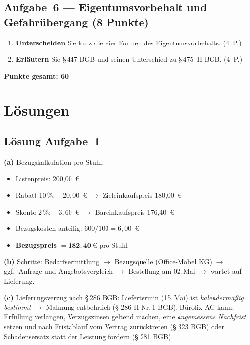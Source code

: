 \documentclass[11pt, a4paper]{article}
\begin{document}
\subsection*{Aufgabe~6 --- Eigentumsvorbehalt und Gefahrübergang (8 Punkte)}

\begin{enumerate}[label=(\alph*)]
  \item \textbf{Unterscheiden} Sie kurz die vier Formen des Eigentumsvorbehalts. \hfill (4~P.)
  \item \textbf{Erläutern} Sie §\,447 BGB und seinen Unterschied zu §\,475~II BGB. \hfill (4~P.)
\end{enumerate}

\vspace{1em}
\noindent\textbf{Punkte gesamt: 60}

\newpage

\section{Lösungen}\label{loesungen}

\subsection*{Lösung Aufgabe~1}

\begin{loesung}
\textbf{(a)} Bezugskalkulation pro Stuhl:
\begin{itemize}[itemsep=0pt]
  \item Listenpreis: 200,00~€
  \item Rabatt 10\,\%: $-20{,}00$~€ $\to$ Zieleinkaufspreis 180,00~€
  \item Skonto 2\,\%: $-3{,}60$~€ $\to$ Bareinkaufspreis 176,40~€
  \item Bezugskosten anteilig: $600 / 100 = 6{,}00$~€
  \item \textbf{Bezugspreis} $= \mathbf{182{,}40~€}$ pro Stuhl
\end{itemize}

\textbf{(b)} Schritte: Bedarfsermittlung $\to$ Bezugsquelle (Office-Möbel KG) $\to$
ggf.\ Anfrage und Angebotsvergleich $\to$ Bestellung am 02.\,Mai $\to$ wartet auf
Lieferung.

\textbf{(c)} Lieferungsverzug nach §\,286 BGB: Liefertermin (15.\,Mai) ist
\emph{kalendermäßig bestimmt} $\to$ Mahnung entbehrlich (§ 286 II Nr.\,1 BGB).
Bürofix AG kann: Erfüllung verlangen, Verzugszinsen geltend machen, eine
\emph{angemessene Nachfrist} setzen und nach Fristablauf vom Vertrag zurücktreten
(§ 323 BGB) oder Schadensersatz statt der Leistung fordern (§ 281 BGB).
\end{loesung}
\end{document}
